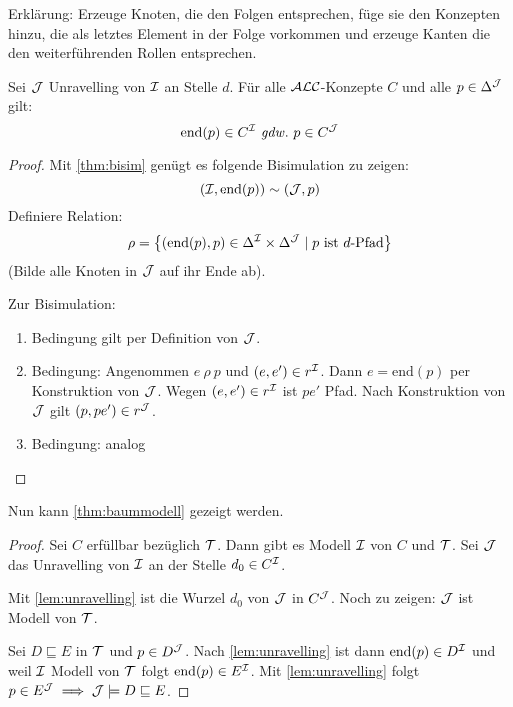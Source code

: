 \begin{tafel}
Erklärung: Erzeuge Knoten, die den Folgen entsprechen, füge sie den
Konzepten hinzu, die als letztes Element in der Folge vorkommen und
erzeuge Kanten die den weiterführenden Rollen entsprechen.
\end{tafel}

\begin{lemma}[Unravelling]
    \label{lemma37}
    \label{lem:unravelling}
Sei $\mathcal{J}$ Unravelling von $\mathcal{I}$ an Stelle $d$. Für alle $\mathcal{A}\mathcal{L}\mathcal{C}$-Konzepte $C$ und alle $p \in \Delta^{\mathcal{J}}$ gilt:
\[ \text{end}\left( p \right) \in C^\MI \gdw p \in C^{\MJ} \]
\end{lemma}

\begin{tafel}
\begin{proof}
    Mit \autoref{thm:bisim} genügt es folgende Bisimulation zu zeigen:
\[ \left( \MI, \text{end}\left( p \right) \right)\sim\left( \MJ,p \right) \]
Definiere Relation:
\[ \rho = \left\{ \left( \text{end}\left( p \right),p \right) \in \Delta^\MI
\times \Delta^{\MJ} \mid p\ \text{ist}\ d\text{-Pfad}\right\}
\]
(Bilde alle Knoten in $\mathcal{J}$ auf ihr Ende ab). 

Zur Bisimulation:
\begin{enumerate}
\item Bedingung gilt per Definition von $\mathcal{J}$.
\item Bedingung:
  Angenommen $e\ \rho\ p$ und
  $\left( e,e' \right) \in r^\MI$. Dann $e = \text{end}\left( p \right)$
  per Konstruktion von $\mathcal{J}$. Wegen $\left( e,e' \right) \in r^\MI$
  ist $pe'$ Pfad. Nach Konstruktion von $\mathcal{J}$ gilt
  $\left( p,pe' \right) \in r^{\MJ}$.
\item Bedingung: analog
\end{enumerate}
\end{proof}
\end{tafel}

Nun kann \autoref{thm:baummodell} gezeigt werden.

\begin{tafel}
\begin{proof}
Sei $C$ erfüllbar bezüglich $\mathcal{T}$. Dann gibt es Modell $\mathcal{I}$ von $C$ und $\mathcal{T}$. Sei $\mathcal{J}$ das Unravelling von $\mathcal{I}$ an der Stelle
$d_0 \in C^{\mathcal{I}}$.

Mit \autoref{lem:unravelling} ist die Wurzel $d_0$ von $\mathcal{J}$ in $C^{\mathcal{J}}$. Noch zu zeigen: $\mathcal{J}$ ist Modell von $\mathcal{T}$. 

Sei $D \sqsubseteq E$ in $\mathcal{T}$ und $p \in D^{\mathcal{J}}$. Nach
\autoref{lem:unravelling} ist dann $\text{end}\left( p \right) \in D^\MI$
und weil $\mathcal{I}$ Modell von $\mathcal{T}$ folgt $\text{end}\left( p \right) \in
E^\MI$. Mit \autoref{lem:unravelling} folgt $p \in E^{\mathcal{J}}
\implies \mathcal{J} \models D \sqsubseteq E$. %
\end{proof}
\end{tafel}

